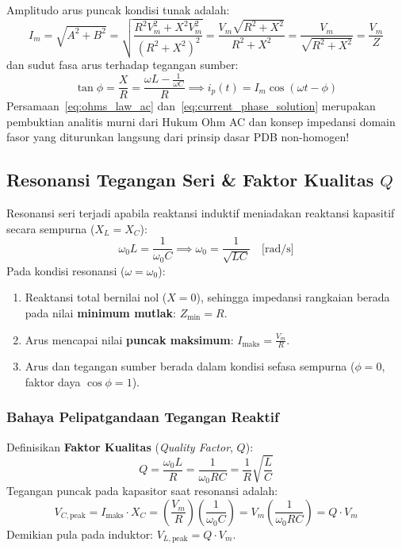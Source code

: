 \documentclass[11pt,a4paper]{article}
\theoremstyle{definition}
\begin{document}
Amplitudo arus puncak kondisi tunak adalah:
\begin{equation}
    I_m = \sqrt{A^2 + B^2} = \sqrt{\frac{R^2 V_m^2 + X^2 V_m^2}{(R^2 + X^2)^2}} = \frac{V_m \sqrt{R^2 + X^2}}{R^2 + X^2} = \frac{V_m}{\sqrt{R^2 + X^2}} = \frac{V_m}{Z}
    \label{eq:ohms_law_ac}
\end{equation}
dan sudut fasa arus terhadap tegangan sumber:
\begin{equation}
    \tan\phi = \frac{X}{R} = \frac{\omega L - \frac{1}{\omega C}}{R} \implies i_p(t) = I_m \cos(\omega t - \phi)
    \label{eq:current_phase_solution}
\end{equation}
Persamaan~\eqref{eq:ohms_law_ac} dan~\eqref{eq:current_phase_solution} merupakan pembuktian analitis murni dari Hukum Ohm AC dan konsep impedansi domain fasor yang diturunkan langsung dari prinsip dasar PDB non-homogen!

\subsection{Resonansi Tegangan Seri \& Faktor Kualitas \texorpdfstring{$Q$}{Q}}

Resonansi seri terjadi apabila reaktansi induktif meniadakan reaktansi kapasitif secara sempurna ($X_L = X_C$):
\begin{equation}
    \omega_0 L = \frac{1}{\omega_0 C} \implies \omega_0 = \frac{1}{\sqrt{LC}} \quad \text{[rad/s]}
    \label{eq:resonance_frequency}
\end{equation}
Pada kondisi resonansi ($\omega = \omega_0$):
\begin{enumerate}[leftmargin=*]
    \item Reaktansi total bernilai nol ($X = 0$), sehingga impedansi rangkaian berada pada nilai \textbf{minimum mutlak}: $Z_{\text{min}} = R$.
    \item Arus mencapai nilai \textbf{puncak maksimum}: $I_{\text{maks}} = \frac{V_m}{R}$.
    \item Arus dan tegangan sumber berada dalam kondisi sefasa sempurna ($\phi = 0$, faktor daya $\cos\phi = 1$).
\end{enumerate}

\subsubsection{Bahaya Pelipatgandaan Tegangan Reaktif}
Definisikan \textbf{Faktor Kualitas} (\textit{Quality Factor}, $Q$):
\begin{equation}
    Q = \frac{\omega_0 L}{R} = \frac{1}{\omega_0 R C} = \frac{1}{R} \sqrt{\frac{L}{C}}
    \label{eq:quality_factor}
\end{equation}
Tegangan puncak pada kapasitor saat resonansi adalah:
\begin{equation}
    V_{C, \text{peak}} = I_{\text{maks}} \cdot X_C = \left( \frac{V_m}{R} \right) \left( \frac{1}{\omega_0 C} \right) = V_m \left( \frac{1}{\omega_0 R C} \right) = Q \cdot V_m
    \label{eq:voltage_magnification}
\end{equation}
Demikian pula pada induktor: $V_{L, \text{peak}} = Q \cdot V_m$.
\end{document}
